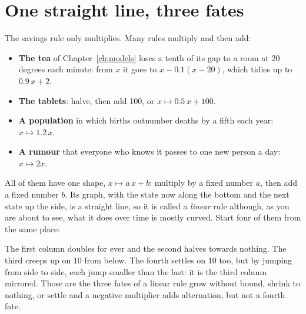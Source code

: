\section{One straight line, three fates}
\label{sec:ch02-fates}

\noindent
The savings rule only multiplies. Many rules multiply and then add:

\begin{itemize}
\item \textbf{The tea} of Chapter~\ref{ch:models} loses a tenth of its gap
  to a room at 20 degrees each minute: from $x$ it goes to
  $x - \num{0.1}(x - 20)$, which tidies up to $\num{0.9}\,x + 2$.
\item \textbf{The tablets}: halve, then add 100, or
  $x \mapsto \num{0.5}\,x + 100$.
\item \textbf{A population} in which births outnumber deaths by a fifth
  each year: $x \mapsto \num{1.2}\,x$.
\item \textbf{A rumour} that everyone who knows it passes to one new person
  a day: $x \mapsto 2x$.
\end{itemize}

\noindent
All of them have one shape, $x \mapsto a\,x + b$: multiply by a fixed
number $a$, then add a fixed number $b$. Its graph, with the state now along
the bottom and the next state up the side, is a straight line, so it is
called a \emph{linear} rule \dash{} although, as you are about to see, what
it does over time is mostly curved. Start four of them from the same place:



\noindent
The first column doubles for ever and the second halves towards nothing.
The third creeps up on $10$ from below. The fourth settles on $10$ too, but
by jumping from side to side, each jump smaller than the last: it is the
third column mirrored. Those are the three fates of a linear rule \dash{}
grow without bound, shrink to nothing, or settle \dash{} and a negative
multiplier adds alternation, but not a fourth fate.


